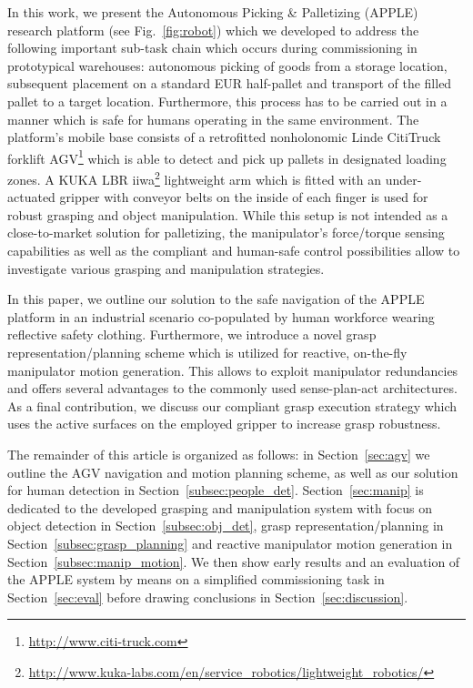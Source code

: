 In this work, we present the Autonomous Picking \& Palletizing (APPLE) research platform (see
Fig.~\ref{fig:robot}) which we developed to address the following important sub-task chain which
occurs during commissioning in prototypical warehouses: autonomous picking of goods from a storage
location, subsequent placement on a standard EUR half-pallet and transport of the filled pallet to a
target location. Furthermore, this process has to be carried out in a manner which is safe for
humans operating in the same environment. The platform's mobile base consists of a retrofitted
nonholonomic Linde CitiTruck forklift AGV\footnote{\url{ http://www.citi-truck.com}} which is able
to detect and pick up pallets in designated loading zones. A KUKA LBR
iiwa\footnote{\url{http://www.kuka-labs.com/en/service_robotics/lightweight_robotics/}} lightweight
arm which is fitted with an under-actuated gripper with conveyor belts on the inside of each finger
is used for robust grasping and object manipulation. While this setup is not intended as a
close-to-market solution for palletizing, the manipulator's force/torque sensing capabilities as
well as the compliant and human-safe control possibilities allow to investigate various grasping and
manipulation strategies.

In this paper, we outline our solution to the safe navigation of the APPLE platform in an industrial
scenario co-populated by human workforce wearing reflective safety clothing. Furthermore, we
introduce a novel grasp representation/planning scheme which is utilized for reactive, on-the-fly
manipulator motion generation. This allows to exploit manipulator redundancies and offers several
advantages to the commonly used sense-plan-act architectures. As a final contribution, we discuss
our compliant grasp execution strategy which uses the active surfaces on the employed gripper to
increase grasp robustness.

The remainder of this article is organized as follows: in Section~\ref{sec:agv} we outline the AGV
navigation and motion planning scheme, as well as our solution for human detection in
Section~\ref{subsec:people_det}. Section~\ref{sec:manip} is dedicated to the developed grasping and
manipulation system with focus on object detection in Section~\ref{subsec:obj_det}, grasp
representation/planning in Section~\ref{subsec:grasp_planning} and reactive manipulator motion
generation in Section~\ref{subsec:manip_motion}. We then show early results and an evaluation of the
APPLE system by means on a simplified commissioning task in Section~\ref{sec:eval} before drawing
conclusions in Section~\ref{sec:discussion}.
